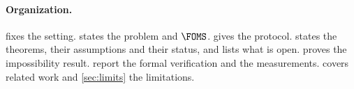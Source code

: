 \paragraph{Organization.}  fixes the setting.  states the problem and $\FOMS$.  gives the protocol.  states the theorems, their assumptions and their status, and lists what is open.  proves the impossibility result.  report the formal verification and the measurements.  covers related work and \cref{sec:limits} the limitations.
